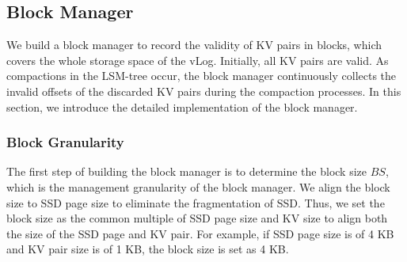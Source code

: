 \documentclass[sigconf]{acmart}
\begin{document}
\subsection{Block Manager} \label{ss1}
We build a block manager to record the validity of KV pairs in blocks, which covers the whole storage space of the vLog. Initially, all KV pairs are valid. As compactions in the LSM-tree occur, the block manager continuously collects the invalid offsets of the discarded KV pairs during the compaction processes. In this section, we introduce the detailed implementation of the block manager.

\subsubsection{Block Granularity}
The first step of building the block manager is to determine the block size $BS$, which is the management granularity of the block manager. We align the block size to SSD page size to eliminate the fragmentation of SSD. Thus, we set the block size as the common multiple of SSD page size and KV size to align both the size of the SSD page and KV pair. For example, if SSD page size is of 4 KB and KV pair size is of 1 KB, the block size is set as 4 KB. 
\end{document}

